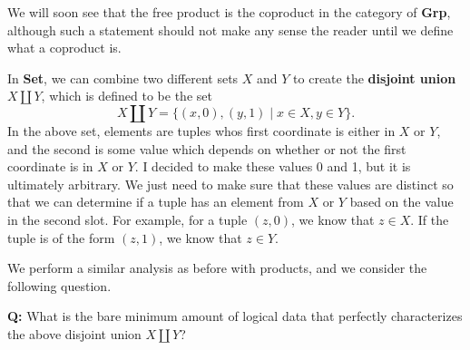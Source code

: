 We will soon see that the free product is the coproduct in the category of \textbf{Grp}, although 
such a statement should not make any sense the reader until we define what a coproduct is. 

\begin{example}
    In \textbf{Set}, we can combine two different sets $X$ and $Y$ to create the 
    \textbf{disjoint union} $X \amalg Y$, which is defined to be the set 
    \[
        X \amalg Y = \bigg\{ (x, 0), (y, 1) \;\bigg|\;  x \in X, y \in Y  \bigg\}.
    \]
    In the above set, elements are tuples whos first coordinate is either 
    in $X$ or $Y$, and the second is some value which depends on whether or not the first 
    coordinate is in $X$ or $Y$. 
    I decided to make these values 0 and 1, but it is ultimately arbitrary. 
    We just need to make sure that these values are distinct so that we can determine if a tuple 
    has an element from $X$ or $Y$ based on the value in the second slot. For example, for a tuple $(z, 0)$, 
    we know that $z \in X$. If the tuple is of the form $(z, 1)$, we know that $z \in Y$. 

    We perform a similar analysis as before with products, and we consider the following question.
    \begin{center}
        \begin{minipage}{0.8\textwidth}
            \textbf{Q:}
            What 
            is the bare minimum amount of logical data that perfectly characterizes 
            the above disjoint union $X \amalg Y$?  
        \end{minipage}
    \end{center}


\end{example}

